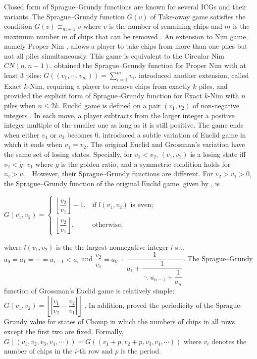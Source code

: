 \documentclass[review]{elsarticle}
\newcommand{\modulo}{\equiv}
\begin{document}
Closed form of Sprague–Grundy functions are known for several ICGs and their variants.
The Sprague–Grundy function $G(v)$ of Take-away game satisfies the condition $G(v) \modulo_{m + 1} v$ where $v$ is the number of remaining chips and $m$ is the maximum number $m$ of chips that can be removed \cite{Gol1966}.
An extension to Nim game, namely Proper Nim \cite{JenM1980}, allows a player to take chips from more than one piles but not all piles simultaneously.
This game is equivalent to the Circular Nim $CN(n, n - 1)$.
\citet{BorGHM2021} obtained the Sprague–Grundy function for Proper Nim with at least $3$ piles: $G((v_1, \cdots, v_m)) = \sum_{i = 1}^m v_i$.
\citet{BorGHMM2018} introduced another extension, called Exact $k$-Nim, requiring a player to remove chips from exactly $k$ piles, and provided the explicit form of Sprague–Grundy function for Exact $k$-Nim with $n$ piles when $n \leq 2k$. 
Euclid game is defined on a pair $(v_1, v_2)$ of non-negative integers \cite{ColD1969}.
In each move, a player subtracts from the larger integer a positive integer multiple of the smaller one as long as it is still positive.
The game ends when either $v_1$ or $v_2$ becomes $0$.
\citet{Gro1997} introduced a subtle variation of Euclid game in which it ends when $v_1 = v_2$.
The original Euclid and Grossman's variation have the same set of losing states. 
Specially, for $v_1 < v_2$, $(v_1, v_2)$ is a losing state iff $v_2 < g \cdot v_1$ where $g$ is the golden ratio, and a symmetric condition holds for $v_2 > v_1$ \cite{ColD1969,Str1998}.
However, their Sprague–Grundy functions are different.
For $v_2 > v_1 > 0$, the Sprague–Grundy function of the original Euclid game, given by \citet{CaiHL2011}, is
\begin{center}
	$G(v_1, v_2) = \begin{cases}
		\left\lfloor \dfrac{v_2}{v_1} \right \rfloor - 1, & \text{if } l(v_1, v_2) \text{ is even}; \\
		\left\lfloor \dfrac{v_2}{v_1} \right \rfloor,  & \text{otherwise}.
	\end{cases}
	$
\end{center}
where $l(v_1, v_2)$ is the the largest nonnegative integer $i$ s.t. $a_0 = a_1 = \cdots = a_{i - 1} < a_i$ and $\dfrac{v_2}{v_1} = a_0 + \dfrac{1}{a_1 + \dfrac{1}{\ddots a_{n - 1} + \dfrac{1}{a_n}}}$.
The Sprague–Grundy function of Grossman's Euclid game is relatively simple: $G(v_1, v_2) = \left\lfloor \left\lvert \dfrac{v_1}{v_2} - \dfrac{v_2}{v_1} \right\rvert \right \rfloor$ \cite{Niv2006}.
In addition, \citet{Byr2003} proved the periodicity of the Sprague-Grundy value for states of Chomp in which the numbers of chips in all rows except the first two are fixed.
Formally, $G((v_1, v_2, v_3, v_4, \cdots)) = G((v_1 + p, v_2 + p, v_3, v_4, \cdots))$ where $v_i$ denotes the number of chips in the $i$-th row and $p$ is the period.
\end{document}
